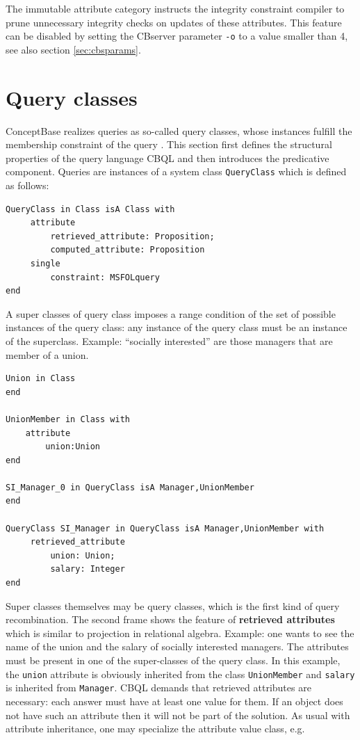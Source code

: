 The immutable attribute category instructs the integrity constraint compiler to prune unnecessary
integrity checks on updates of these attributes. This feature can be disabled by setting the
CBserver parameter {\tt-o} to a value smaller than 4, see also section \ref{sec:cbsparams}.




\section{Query classes}
\label{sec:CBQL}

ConceptBase realizes queries as so-called query classes, whose instances 
fulfill the membership constraint of the query \cite{stau90}. 
This section first defines the
structural properties of the query language CBQL and then introduces the
predicative component. Queries are instances of a system class {\tt QueryClass}
which is defined as follows:

{\small
\begin{verbatim}
QueryClass in Class isA Class with
     attribute
         retrieved_attribute: Proposition;
         computed_attribute: Proposition
     single
         constraint: MSFOLquery
end
\end{verbatim}
}

A super classes of query class imposes a range condition of the set of possible instances of
the query class: any instance of the query class must be an instance of the superclass.
Example: ``socially interested'' are those
managers that are member of a union.

{\small
\begin{verbatim}
Union in Class
end

UnionMember in Class with
    attribute
        union:Union
end

SI_Manager_0 in QueryClass isA Manager,UnionMember
end

QueryClass SI_Manager in QueryClass isA Manager,UnionMember with
     retrieved_attribute
         union: Union;
         salary: Integer
end
\end{verbatim}
}

Super classes themselves may be query classes, which is the
first kind of query recombination. The second frame shows the feature of
{\bf retrieved attributes} which is similar to projection in relational algebra.
Example: one wants to see the name of the union and the salary of socially
interested managers. The attributes must be present in one of the
super-classes of the query class. In this example, the {\tt union} attribute is
obviously inherited from the class {\tt UnionMember} and {\tt salary} is inherited from
{\tt Manager}.  CBQL demands that retrieved attributes are necessary: each answer
must have at least one value for them. If an object does not have such an attribute then it
will not be part of the solution. As usual with attribute inheritance, one
may specialize the attribute value class, e.g.


